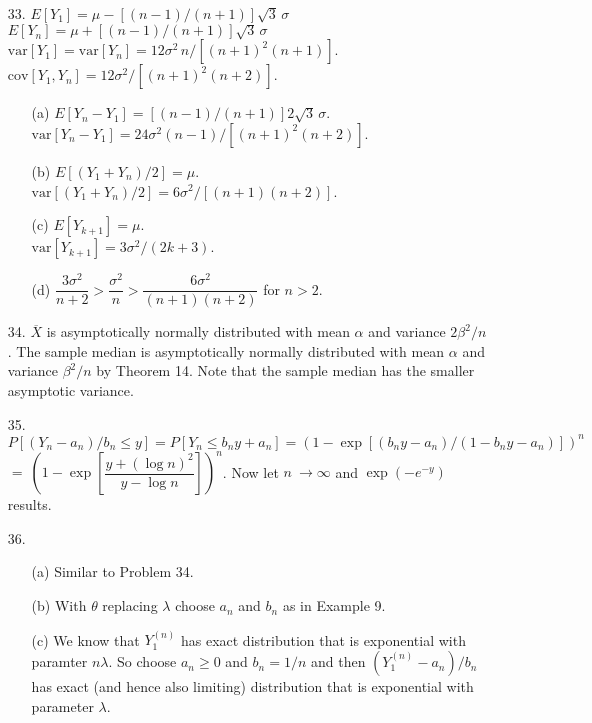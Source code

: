 \begin{enumerate}
	\item[33.] $E[Y_1] = \mu - [(n-1)/(n+1)]\sqrt{3}\, \sigma$ \\
	$E[Y_n] = \mu + [(n-1)/(n+1)]\sqrt{3}\, \sigma$ \\
	$\mbox{var}[Y_1] = \mbox{var}[Y_n] = 12\sigma^2\, n/[(n+1)^2(n+1)]$. \\
	$\mbox{cov}[Y_1,Y_n] = 12\sigma^2/[(n+1)^2(n+2)]$.

	\newpage
	
	\begin{enumerate}
		\item[(a)] $E[Y_n - Y_1] = [(n-1)/(n+1)]2\sqrt{3}\, \sigma$. \\
			$\mbox{var}[Y_n-Y_1] = 24\sigma^2(n-1)/[(n+1)^2(n+2)]$. 
		\item[(b)] $E[(Y_1+Y_n)/2] = \mu.$ \\
			$\mbox{var}[(Y_1+Y_n)/2] = 6\sigma^2/[(n+1)(n+2)]$.
		\item[(c)] $E[Y_{k+1}] = \mu$. \\
			$\mbox{var}[Y_{k+1}] = 3\sigma^2/(2k+3)$. 
		\item[(d)] $\dfrac{3\sigma^2}{n+2} > \dfrac{\sigma^2}{n} > \dfrac{6\sigma^2}{(n+1)(n+2)}$ for $n > 2$.
	\end{enumerate}
	
	\item[34.] $\overline{X}$ is asymptotically normally distributed with mean $\alpha$ and variance $2\beta^2/n$. The sample median is asymptotically normally distributed with mean $\alpha$ and variance $\beta^2/n$ by Theorem 14. Note that the sample median has the smaller asymptotic variance. 

	\item[35.] $P[(Y_n-a_n)/b_n \le y] = P[Y_n \le b_ny + a_n] = (1 - \exp[(b_ny-a_n)/(1-b_ny-a_n)])^n$ \\
	$=\ (1 - \exp[\dfrac{y+(\log n)^2}{y-\log n}])^n$. Now let $n\ \to \infty$ and $\exp(-e^{-y})$ results.

	\item[36.] \begin{enumerate}
		\item[(a)] Similar to Problem 34.
		\item[(b)] With $\theta$ replacing $\lambda$ choose $a_n$ and $b_n$ as in Example 9.
		\item[(c)] We know that $Y_1^{(n)}$ has exact distribution that is exponential with paramter $n\lambda$. So choose $a_n \ge 0$ and $b_n= 1/n$ and then $(Y_1^{(n)} - a_n)/b_n$ has exact (and hence also limiting) distribution that is exponential with parameter $\lambda$.
 	\end{enumerate}

\end{enumerate}